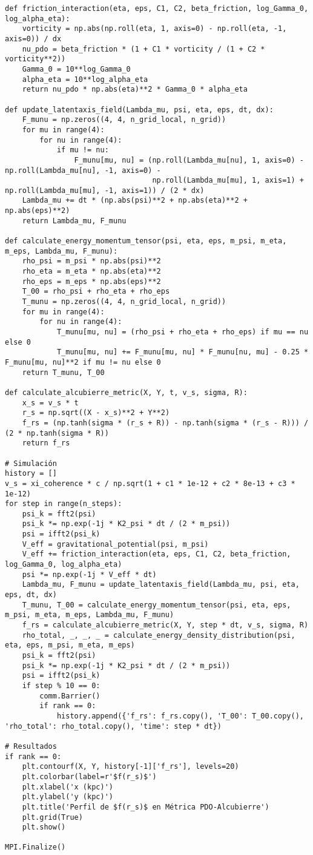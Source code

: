 \documentclass[a4paper,12pt]{article}
\begin{document}
\begin{verbatim}
def friction_interaction(eta, eps, C1, C2, beta_friction, log_Gamma_0, log_alpha_eta):
    vorticity = np.abs(np.roll(eta, 1, axis=0) - np.roll(eta, -1, axis=0)) / dx
    nu_pdo = beta_friction * (1 + C1 * vorticity / (1 + C2 * vorticity**2))
    Gamma_0 = 10**log_Gamma_0
    alpha_eta = 10**log_alpha_eta
    return nu_pdo * np.abs(eta)**2 * Gamma_0 * alpha_eta

def update_latentaxis_field(Lambda_mu, psi, eta, eps, dt, dx):
    F_munu = np.zeros((4, 4, n_grid_local, n_grid))
    for mu in range(4):
        for nu in range(4):
            if mu != nu:
                F_munu[mu, nu] = (np.roll(Lambda_mu[nu], 1, axis=0) - np.roll(Lambda_mu[nu], -1, axis=0) -
                                  np.roll(Lambda_mu[mu], 1, axis=1) + np.roll(Lambda_mu[mu], -1, axis=1)) / (2 * dx)
    Lambda_mu += dt * (np.abs(psi)**2 + np.abs(eta)**2 + np.abs(eps)**2)
    return Lambda_mu, F_munu

def calculate_energy_momentum_tensor(psi, eta, eps, m_psi, m_eta, m_eps, Lambda_mu, F_munu):
    rho_psi = m_psi * np.abs(psi)**2
    rho_eta = m_eta * np.abs(eta)**2
    rho_eps = m_eps * np.abs(eps)**2
    T_00 = rho_psi + rho_eta + rho_eps
    T_munu = np.zeros((4, 4, n_grid_local, n_grid))
    for mu in range(4):
        for nu in range(4):
            T_munu[mu, nu] = (rho_psi + rho_eta + rho_eps) if mu == nu else 0
            T_munu[mu, nu] += F_munu[mu, nu] * F_munu[nu, mu] - 0.25 * F_munu[mu, nu]**2 if mu != nu else 0
    return T_munu, T_00

def calculate_alcubierre_metric(X, Y, t, v_s, sigma, R):
    x_s = v_s * t
    r_s = np.sqrt((X - x_s)**2 + Y**2)
    f_rs = (np.tanh(sigma * (r_s + R)) - np.tanh(sigma * (r_s - R))) / (2 * np.tanh(sigma * R))
    return f_rs

# Simulación
history = []
v_s = xi_coherence * c / np.sqrt(1 + c1 * 1e-12 + c2 * 8e-13 + c3 * 1e-12)
for step in range(n_steps):
    psi_k = fft2(psi)
    psi_k *= np.exp(-1j * K2_psi * dt / (2 * m_psi))
    psi = ifft2(psi_k)
    V_eff = gravitational_potential(psi, m_psi)
    V_eff += friction_interaction(eta, eps, C1, C2, beta_friction, log_Gamma_0, log_alpha_eta)
    psi *= np.exp(-1j * V_eff * dt)
    Lambda_mu, F_munu = update_latentaxis_field(Lambda_mu, psi, eta, eps, dt, dx)
    T_munu, T_00 = calculate_energy_momentum_tensor(psi, eta, eps, m_psi, m_eta, m_eps, Lambda_mu, F_munu)
    f_rs = calculate_alcubierre_metric(X, Y, step * dt, v_s, sigma, R)
    rho_total, _, _, _ = calculate_energy_density_distribution(psi, eta, eps, m_psi, m_eta, m_eps)
    psi_k = fft2(psi)
    psi_k *= np.exp(-1j * K2_psi * dt / (2 * m_psi))
    psi = ifft2(psi_k)
    if step % 10 == 0:
        comm.Barrier()
        if rank == 0:
            history.append({'f_rs': f_rs.copy(), 'T_00': T_00.copy(), 'rho_total': rho_total.copy(), 'time': step * dt})

# Resultados
if rank == 0:
    plt.contourf(X, Y, history[-1]['f_rs'], levels=20)
    plt.colorbar(label=r'$f(r_s)$')
    plt.xlabel('x (kpc)')
    plt.ylabel('y (kpc)')
    plt.title('Perfil de $f(r_s)$ en Métrica PDO-Alcubierre')
    plt.grid(True)
    plt.show()

MPI.Finalize()
\end{verbatim}
\end{document}
